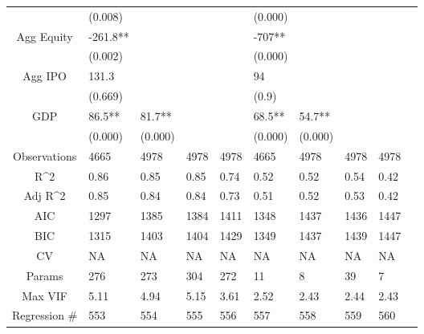 \documentclass{article}
\begin{document}
\begin{table}[H]
\begin{tabular}{|clllllllll|}
   & (0.008) &  &  &  & (0.000) &  &  &  & \\
  Agg Equity & -261.8** &  &  &  & -707** &  &  &  & \\
   & (0.002) &  &  &  & (0.000) &  &  &  & \\
  Agg IPO & 131.3 &  &  &  & 94 &  &  &  & \\
   & (0.669) &  &  &  & (0.9) &  &  &  & \\
  GDP & 86.5** & 81.7** &  &  & 68.5** & 54.7** &  &  & \\
   & (0.000) & (0.000) &  &  & (0.000) & (0.000) &  &  & \\
  \hline
 Observations & 4665 & 4978 & 4978 & 4978 & 4665 & 4978 & 4978 & 4978 & \\
  R^2 & 0.86 & 0.85 & 0.85 & 0.74 & 0.52 & 0.52 & 0.54 & 0.42 & \\
  Adj R^2 & 0.85 & 0.84 & 0.84 & 0.73 & 0.51 & 0.52 & 0.53 & 0.42 & \\
  AIC & 1297 & 1385 & 1384 & 1411 & 1348 & 1437 & 1436 & 1447 & \\
  BIC & 1315 & 1403 & 1404 & 1429 & 1349 & 1437 & 1439 & 1447 & \\
  CV & NA & NA & NA & NA & NA & NA & NA & NA & \\
  Params & 276 & 273 & 304 & 272 & 11 & 8 & 39 & 7 & \\
  Max VIF & 5.11 & 4.94 & 5.15 & 3.61 & 2.52 & 2.43 & 2.44 & 2.43 & \\
  Regression \# & 553 & 554 & 555 & 556 & 557 & 558 & 559 & 560 & \\
   \hline
\end{tabular}

\end{table}
\end{document}
